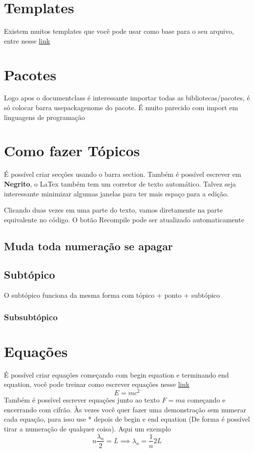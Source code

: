 \documentclass[a4paper]{article}
\begin{document}
\newpage

\tableofcontents
\thispagestyle{empty}

\newpage


\section{Templates}
Existem muitos templates que você pode usar como base para o seu arquivo, entre nesse \href{https://www.overleaf.com/latex/templates}{link}
\section{Pacotes}
Logo apos o documentclass é interessante importar todas as bibliotecas/pacotes, é só colocar barra usepackage{nome do pacote}. É muito parecido com import em linguagens de programação
\section{Como fazer Tópicos}
É possível criar secções usando o barra section{}. Também é possível escrever em \textbf{Negrito}, o LaTex também tem um corretor de texto automático. Talvez seja interessante minimizar algumas janelas para ter mais espaço para a edição. 

Clicando duas vezes em uma parte do texto, vamos diretamente na parte equivalente no código. O botão Recompile pode ser atualizado automaticamente
\subsection{Muda toda numeração se apagar}
\subsection{Subtópico}
O subtópico funciona da mesma forma com tópico + ponto + subtópico
\subsubsection{Subsubtópico}
\section{Equações}
É possível criar equações começando com begin equation e terminando end equation, você pode treinar como escrever equações nesse \href{https://editor.codecogs.com/?lang=pt-pt}{link}
\begin{equation}
    E=mc^2
\end{equation}
Também é possível escrever equações junto ao texto $F=ma$ começando e encerrando com cifrão. Às vezes você quer fazer uma demonstração sem numerar cada equação, para isso use * depois de begin e end equation (De forma é possível tirar a numeração de qualquer coisa). Aqui um exemplo
\begin{equation}
    \label{eqn:comp_onda1}
    n \frac{\lambda_n}{2} = L \implies \lambda_n = \frac{1}{n} 2L
\end{equation}
\end{document}
